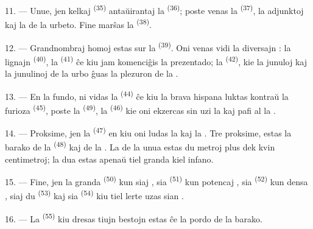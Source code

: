 11. --- Unue, jen kelkaj  \textsuperscript{(35)} antaŭirantaj la
 \textsuperscript{(36)}; poste venas la 
\textsuperscript{(37)}, la adjunktoj kaj la  de
la urbeto. Fine marŝas la  \textsuperscript{(38)}.

\VUsaut{5.0mm}
\VUsaut{3.6mm}

12. --- Grandnombraj homoj estas sur la 
\textsuperscript{(39)}. Oni venas vidi la diversajn : la
lignajn  \textsuperscript{(40)}, la 
\textsuperscript{(41)} ĉe kiu jam komenciĝis la prezentado; la  \textsuperscript{(42)}, kie la junuloj kaj la junulinoj de la urbo ĝuas
la plezuron de la .

13. --- En la fundo, ni vidas la  \textsuperscript{(44)} ĉe kiu
la brava hispana  luktas kontraŭ la furioza 
\textsuperscript{(45)}, poste la  \textsuperscript{(49)},
la  \textsuperscript{(46)} kie oni ekzercas sin uzi la
 kaj pafi al la .

14. --- Proksime, jen la  \textsuperscript{(47)} en kiu
oni ludas la  kaj la . Tre proksime, estas la
barako de la  \textsuperscript{(48)} kaj de la .
La  de la unua estas du metroj plus dek kvin centimetroj; la
dua estas apenaŭ tiel granda kiel infano.

15. --- Fine, jen la granda  \textsuperscript{(50)} kun siaj
, sia  \textsuperscript{(51)} kun potencaj
, sia  \textsuperscript{(52)} kun densa
, siaj du  \textsuperscript{(53)} kaj sia
 \textsuperscript{(54)} kiu tiel lerte uzas sian
.

16. --- La  \textsuperscript{(55)} kiu dresas tiujn bestojn
estas ĉe la pordo de la barako.
\VUsaut{6.0mm}
\VUfilet{22mm}
